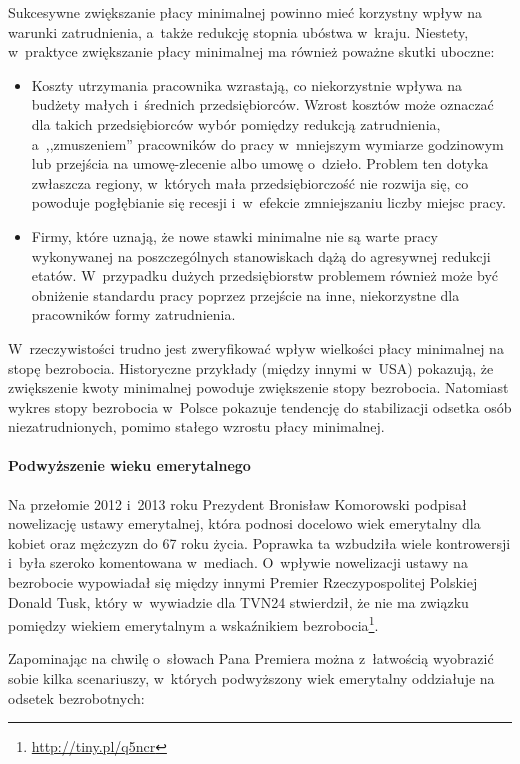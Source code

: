 \documentclass[12pt]{article}
\begin{document}
    Sukcesywne zwiększanie płacy minimalnej powinno mieć korzystny wpływ na warunki zatrudnienia, a~także redukcję stopnia ubóstwa w~kraju. Niestety, w~praktyce zwiększanie płacy minimalnej ma również poważne skutki uboczne:
    
    \begin{itemize}
        \item Koszty utrzymania pracownika wzrastają, co niekorzystnie wpływa na budżety małych i~średnich przedsiębiorców. Wzrost kosztów może oznaczać dla takich przedsiębiorców wybór pomiędzy redukcją zatrudnienia, a~,,zmuszeniem'' pracowników do pracy w~mniejszym wymiarze godzinowym lub przejścia na umowę-zlecenie albo umowę o~dzieło. Problem ten dotyka zwłaszcza regiony, w~których mała przedsiębiorczość nie rozwija się, co powoduje pogłębianie się recesji i~w~efekcie zmniejszaniu liczby miejsc pracy.
        \item Firmy, które uznają, że nowe stawki minimalne nie są warte pracy wykonywanej na poszczególnych stanowiskach dążą do agresywnej redukcji etatów. W~przypadku dużych przedsiębiorstw problemem również może być obniżenie standardu pracy poprzez przejście na inne, niekorzystne dla pracowników formy zatrudnienia.
    \end{itemize}

    W~rzeczywistości trudno jest zweryfikować wpływ wielkości płacy minimalnej na stopę bezrobocia. Historyczne przykłady (między innymi w~USA) pokazują, że zwiększenie kwoty minimalnej powoduje zwiększenie stopy bezrobocia. Natomiast wykres stopy bezrobocia w~Polsce pokazuje tendencję do stabilizacji odsetka osób niezatrudnionych, pomimo stałego wzrostu płacy minimalnej.
    
    \paragraph{Podwyższenie wieku emerytalnego}
    
    Na przełomie 2012 i~2013 roku Prezydent Bronisław Komorowski podpisał nowelizację ustawy emerytalnej, która podnosi docelowo wiek emerytalny dla kobiet oraz mężczyzn do 67 roku życia. Poprawka ta wzbudziła wiele kontrowersji i~była szeroko komentowana w~mediach. O~wpływie nowelizacji ustawy na bezrobocie wypowiadał się między innymi Premier Rzeczypospolitej Polskiej Donald Tusk, który w~wywiadzie dla TVN24 stwierdził, że nie ma związku pomiędzy wiekiem emerytalnym a wskaźnikiem bezrobocia\footnote{\url{http://tiny.pl/q5ncr}}.
    
    Zapominając na chwilę o~słowach Pana Premiera można z~łatwością wyobrazić sobie kilka scenariuszy, w~których podwyższony wiek emerytalny oddziałuje na odsetek bezrobotnych:
    
\end{document}
